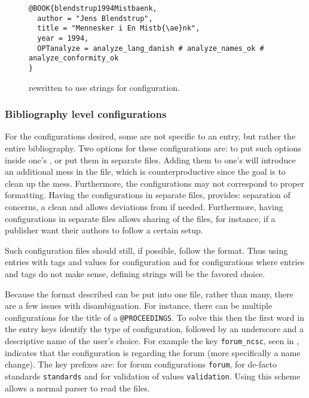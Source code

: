\begin{figure}
  \centering
\begin{verbatim}
@BOOK{blendstrup1994Mistbaenk,
  author = "Jens Blendstrup",
  title = "Mennesker i En Mistb{\ae}nk",
  year = 1994,
  OPTanalyze = analyze_lang_danish # analyze_names_ok # analyze_conformity_ok
}
\end{verbatim}
  \caption{
    rewritten to use strings for configuration.}
  \label{fig:analyzing_added_de_facto_standards_strings}
\end{figure}


\subsubsection{Bibliography level configurations}

For the configurations desired, some are not specific to an entry, but
rather the entire bibliography.  Two options for these configurations
are: to put such options inside one's , or put them in
separate files.  Adding them to one's  will introduce an
additional mess in the file, which is counterproductive since the goal
is to clean up the mess.  Furthermore, the configurations may not
correspond to proper {\bibtex} formatting.  Having the configurations
in separate files, provides: separation of concerns, a clean
 and allows deviations from {\bibtex} if needed.
Furthermore, having configurations in separate files allows sharing of
the files, for instance, if a publisher want their authors to follow a
certain setup.

Such configuration files should still, if possible, follow the
{\bibtex} format.  Thus using entries with tags and values for
configuration and for configurations where entries and tags do not
make sense, defining {\bibtex} strings will be the favored choice.

Because the format described can be put into one file, rather than
many, there are a few issues with disambiguation.  For instance, there
can be multiple configurations for the title of a
\texttt{@PROCEEDINGS}.  To solve this then the first word in the entry
keys identify the type of configuration, followed by an underscore and
a descriptive name of the user's choice.  For example the key
\texttt{forum\_ncsc}, seen in
, indicates that the
configuration is regarding the forum (more specifically a name
change).  The key prefixes are: for forum configurations
\texttt{forum}, for de-facto standards \texttt{standards} and for
validation of values \texttt{validation}.  Using this scheme allows a
normal {\bibtex} parser to read the files.

